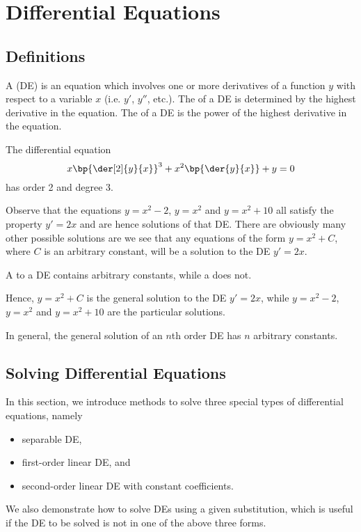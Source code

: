 \chapter{Differential Equations}

\section{Definitions}

\begin{definition}
    A  (DE) is an equation which involves one or more derivatives of a function $y$ with respect to a variable $x$ (i.e. $y'$, $y''$, etc.). The  of a DE is determined by the highest derivative in the equation. The  of a DE is the power of the highest derivative in the equation.
\end{definition}

\begin{example}
    The differential equation \[x \bp{\der[2]{y}{x}}^3 + x^2 \bp{\der{y}{x}} + y = 0\] has order 2 and degree 3.
\end{example}

Observe that the equations $y = x^2 - 2$, $y = x^2$ and $y = x^2 + 10$ all satisfy the property $y' = 2x$ and are hence solutions of that DE. There are obviously many other possible solutions are we see that any equations of the form $y = x^2 + C$, where $C$ is an arbitrary constant, will be a solution to the DE $y' = 2x$.

\begin{definition}
    A  to a DE contains arbitrary constants, while a  does not.
\end{definition}

Hence, $y = x^2 + C$ is the general solution to the DE $y' = 2x$, while $y = x^2 - 2$, $y = x^2$ and $y = x^2 + 10$ are the particular solutions.

In general, the general solution of an $n$th order DE has $n$ arbitrary constants.

\section{Solving Differential Equations}

In this section, we introduce methods to solve three special types of differential equations, namely
\begin{itemize}
    \item separable DE,
    \item first-order linear DE, and
    \item second-order linear DE with constant coefficients.
\end{itemize}
We also demonstrate how to solve DEs using a given substitution, which is useful if the DE to be solved is not in one of the above three forms.

